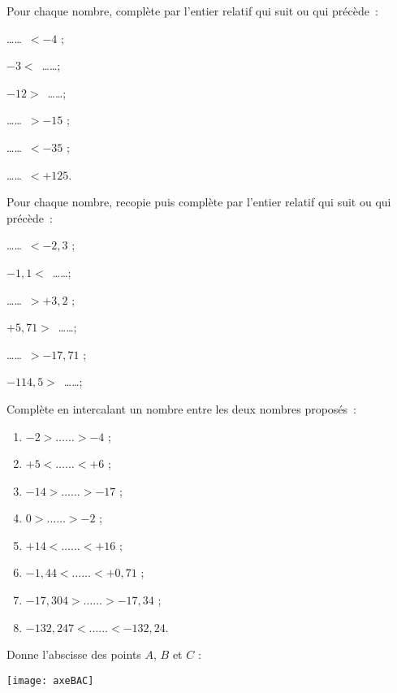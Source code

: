 \begin{exercice}
Pour chaque nombre, complète par l'entier relatif qui suit ou qui précède :
\begin{colenumerate}{2}
 \item \ldots \ldots $< - 4$ ;
 \item $- 3 <$ \ldots \ldots ;
 \item $- 12 >$ \ldots \ldots ;
 \item \ldots \ldots $> - 15$ ;
 \item \ldots \ldots $< - 35$ ;
 \item \ldots \ldots $< + 125$. 
 \end{colenumerate}	
\end{exercice}


\begin{exercice}
Pour chaque nombre, recopie puis complète par l'entier relatif qui suit ou qui précède :
\begin{colenumerate}{2}
 \item \ldots \ldots $< - 2,3$ ;
 \item $- 1,1 <$ \ldots \ldots ;
 \item \ldots \ldots $> + 3,2$ ;
 \item $+ 5,71 >$ \ldots \ldots ;
 \item \ldots \ldots $> - 17,71$ ;
 \item $- 114,5 >$ \ldots \ldots ;
 \end{colenumerate}	
\end{exercice}


\begin{exercice}
Complète en intercalant un nombre entre les deux nombres proposés :
\begin{enumerate}
 \item $- 2 > \ldots \ldots > - 4$ ;
 \item $+ 5 < \ldots \ldots < + 6$ ;
 \item $- 14 > \ldots \ldots > - 17$ ;
 \item $0 > \ldots \ldots > - 2$ ;
 \item $+ 14 < \ldots \ldots < + 16$ ;
 \item $- 1,44 < \ldots \ldots < + 0,71$ ;
 \item $- 17,304 > \ldots \ldots > - 17,34$ ;
 \item $- 132,247 < \ldots \ldots < - 132,24$.
 \end{enumerate}
\end{exercice}


\begin{exercice}
Donne l'abscisse des points $A$, $B$ et $C$ :
\begin{center} \texttt{[image: axeBAC]} \end{center}

\dotfill

\dotfill
\end{exercice}


